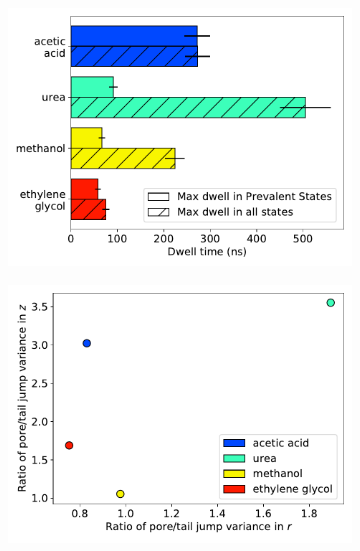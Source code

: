 \documentclass[journal=jpcbfk,manuscript=article]{achemso}
\begin{document}
\begin{figure}
\begin{subfigure}{0.45\textwidth}
  \caption{}\label{fig:rdf_summary}
  \end{subfigure}
  \begin{subfigure}{0.45\textwidth}
  \includegraphics[width=\textwidth]{dwell_time_summary.pdf}
  \caption{}\label{fig:dwell_time_summary}
  \end{subfigure}
  \begin{subfigure}{0.45\textwidth}
  \includegraphics[width=\textwidth]{cov_summary.pdf}
  \caption{}\label{fig:cov_summary}
  \end{subfigure}

\end{figure}
\end{document}
